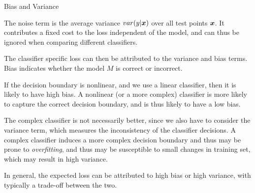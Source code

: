\begin{frame}{Bias and Variance}
\small

The noise term is the average variance
$var(y|{\boldsymbol x})$ over all test points ${\boldsymbol x}$. It contributes a f\/{i}xed
cost to the loss independent of the model, and can thus be ignored
when comparing different classif\/{i}ers. 

\medskip
The classif\/{i}er specif\/{i}c loss
can then be attributed to the variance and bias terms. 
Bias indicates whether the model $M$ is correct or incorrect. 

\medskip
If the decision boundary is
nonlinear, and we use a linear classif\/{i}er, then it is likely to
have high bias. A nonlinear (or a
more complex) classif\/{i}er is more likely to capture the correct
decision boundary, and is thus likely to have a low bias.

\medskip
The complex
classif\/{i}er is not necessarily better, since we also have to consider
the variance term, which measures the inconsistency of the
classif\/{i}er decisions. A complex classif\/{i}er induces a more complex
decision boundary and thus may be prone to {\em overf\/{i}tting},
and thus may be
susceptible to small changes in training set, which may result in
high variance.

\medskip
In general, the expected loss can be attributed to high bias or
high variance, with typically a trade-off between the two.
\end{frame}



